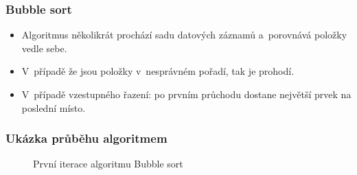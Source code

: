 \documentclass{beamer}
\begin{document}
\begin{frame}\frametitle{Bubble sort}
    \begin{itemize}
        \item Algoritmus několikrát prochází sadu datových záznamů a~\alert{porovnává položky vedle sebe}.
        \item V~případě že jsou položky v~nesprávném pořadí, tak je prohodí.
        \item V~případě vzestupného řazení: po prvním průchodu dostane \alert{největší prvek na poslední místo}.
    \end{itemize}
\end{frame}

\begin{frame}\frametitle{Ukázka průběhu algoritmem}
    \begin{figure}[h]
        \caption{První iterace algoritmu Bubble sort}
        \label{obr1}
    \end{figure}
\end{frame}
\end{document}
